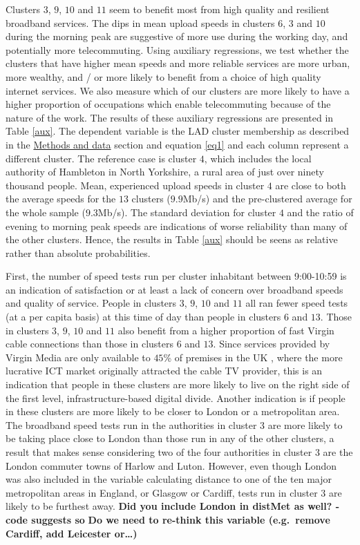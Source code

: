 \documentclass[]{interact}
\theoremstyle{plain}%
\theoremstyle{definition}
\theoremstyle{remark}
\begin{document}
Clusters \(3\), \(9\), \(10\) and \(11\) seem to benefit most from high
quality and resilient broadband services. The dips in mean upload speeds
in clusters \(6\), \(3\) and \(10\) during the morning peak are
suggestive of more use during the working day, and potentially more
telecommuting. Using auxiliary regressions, we test whether the clusters
that have higher mean speeds and more reliable services are more urban,
more wealthy, and / or more likely to benefit from a choice of high
quality internet services. We also measure which of our clusters are
more likely to have a higher proportion of occupations which enable
telecommuting because of the nature of the work. The results of these
auxiliary regressions are presented in Table \ref{aux}. The dependent
variable is the LAD cluster membership as described in the
\protect\hyperlink{sec:3}{Methods and data} section and equation
\ref{eq1} and each column represent a different cluster. The reference
case is cluster \(4\), which includes the local authority of Hambleton
in North Yorkshire, a rural area of just over ninety thousand people.
Mean, experienced upload speeds in cluster \(4\) are close to both the
average speeds for the \(13\) clusters (\(9.9\)Mb/s) and the
pre-clustered average for the whole sample (\(9.3\)Mb/s). The standard
deviation for cluster \(4\) and the ratio of evening to morning peak
speeds are indications of worse reliability than many of the other
clusters. Hence, the results in Table \ref{aux} should be seens as
relative rather than absolute probabilities.

First, the number of speed tests run per cluster inhabitant between
9:00-10:59 is an indication of satisfaction or at least a lack of
concern over broadband speeds and quality of service. People in clusters
\(3\), \(9\), \(10\) and \(11\) all ran fewer speed tests (at a per
capita basis) at this time of day than people in clusters \(6\) and
\(13\). Those in clusters \(3\), \(9\), \(10\) and \(11\) also benefit
from a higher proportion of fast Virgin cable connections than those in
clusters \(6\) and \(13\). Since services provided by Virgin Media are
only available to \(45\)\% of premises in the UK \citep{ofcom2016},
where the more lucrative ICT market originally attracted the cable TV
provider, this is an indication that people in these clusters are more
likely to live on the right side of the first level,
infrastructure-based digital divide. Another indication is if people in
these clusters are more likely to be closer to London or a metropolitan
area. The broadband speed tests run in the authorities in cluster \(3\)
are more likely to be taking place close to London than those run in any
of the other clusters, a result that makes sense considering two of the
four authorities in cluster \(3\) are the London commuter towns of
Harlow and Luton. However, even though London was also included in the
variable calculating distance to one of the ten major metropolitan areas
in England, or Glasgow or Cardiff, tests run in cluster \(3\) are likely
to be furthest away. \textbf{Did you include London in distMet as well?
- code suggests so} \textbf{Do we need to re-think this variable
(e.g.~remove Cardiff, add Leicester or\ldots)}
\end{document}
